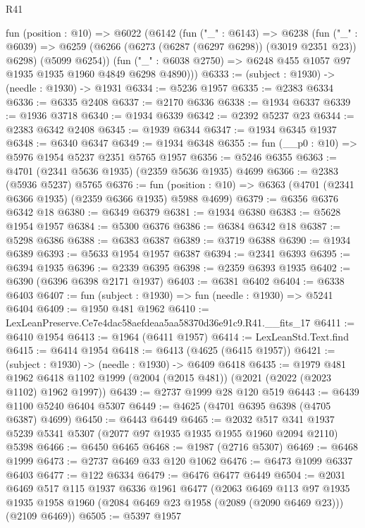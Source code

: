 \begin{lexlean}{R41}
\begin{coremodule}
  fun (position : @10) =>
  @6022
    (@6142
      (fun ("_" : @6143) =>
      @6238
        (fun ("_" : @6039) =>
        @6259 (@6266 (@6273 (@6287 (@6297 @6298)) (@3019 @2351 @23)) @6298) (@5099 @6254))
        (fun ("_" : @6038 @2750) => @6248 @455 @1057 @97 @1935 @1935 @1960 @4849 @6298 @4890)))
@6333 := (subject : @1930) -> (needle : @1930) -> @1931
@6334 := @5236 @1957
@6335 := @2383 @6334
@6336 := @6335 @2408
@6337 := @2170 @6336
@6338 := @1934 @6337
@6339 := @1936 @3718
@6340 := @1934 @6339
@6342 := @2392 @5237 @23
@6344 := @2383 @6342 @2408
@6345 := @1939 @6344
@6347 := @1934 @6345 @1937
@6348 := @6340 @6347
@6349 := @1934 @6348
@6355 := fun (__p0 : @10) => @5976 @1954 @5237 @2351 @5765 @1957
@6356 := @5246 @6355
@6363 := @4701 (@2341 @5636 @1935) (@2359 @5636 @1935) @4699
@6366 := @2383 (@5936 @5237) @5765
@6376 := fun (position : @10) => @6363 (@4701 (@2341 @6366 @1935) (@2359 @6366 @1935) @5988 @4699)
@6379 := @6356 @6376 @6342 @18
@6380 := @6349 @6379
@6381 := @1934 @6380
@6383 := @5628 @1954 @1957
@6384 := @5300 @6376
@6386 := @6384 @6342 @18
@6387 := @5298 @6386
@6388 := @6383 @6387
@6389 := @3719 @6388
@6390 := @1934 @6389
@6393 := @5633 @1954 @1957 @6387
@6394 := @2341 @6393
@6395 := @6394 @1935
@6396 := @2339 @6395
@6398 := @2359 @6393 @1935
@6402 := @6390 (@6396 @6398 @2171 @1937)
@6403 := @6381 @6402
@6404 := @6338 @6403
@6407 := fun (subject : @1930) => fun (needle : @1930) => @5241 @6404
@6409 := @1950 @481 @1962
@6410 := LexLeanPreserve.Ce7e4dac58aefdeaa5aa58370d36e91c9.R41.__fits_17
@6411 := @6410 @1954
@6413 := @1964 (@6411 @1957)
@6414 := LexLeanStd.Text.find
@6415 := @6414 @1954
@6418 := @6413 (@4625 (@6415 @1957))
@6421 := (subject : @1930) -> (needle : @1930) -> @6409 @6418
@6435 := @1979
    @481
    @1962
    @6418
    @1102
    @1999
    (@2004 (@2015 @481))
    (@2021 (@2022 (@2023 @1102) @1962 @1997))
@6439 := @2737 @1999 @28 @120 @519
@6443 := @6439 @1100 @5240 @6404 @5307
@6449 := @4625 (@4701 @6395 @6398 (@4705 @6387) @4699)
@6450 := @6443 @6449
@6465 := @2032
    @517
    @341
    @1937
    @5239
    @5341
    @5307
    (@2077 @97 @1935 @1935 @1955 @1960 @2094 @2110)
    @5398
@6466 := @6450 @6465
@6468 := @1987 (@2716 @5307)
@6469 := @6468 @1999
@6473 := @2737 @6469 @33 @120 @1062
@6476 := @6473 @1099 @6337 @6403
@6477 := @122 @6334
@6479 := @6476 @6477 @6449
@6504 := @2031
    @6469
    @517
    @115
    @1937
    @6336
    @1961
    @6477
    (@2063
      @6469
      @113
      @97
      @1935
      @1935
      @1958
      @1960
      (@2084 @6469 @23 @1958 (@2089 (@2090 @6469 @23)))
      (@2109 @6469))
@6505 := @5397 @1957

\end{coremodule}
\end{lexlean}
